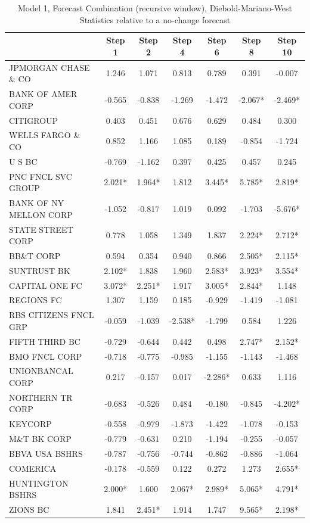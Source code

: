 \documentclass[11pt]{article}
\begin{document}
\begin{table} 
\caption{Model 1, Forecast Combination (recursive window), Diebold-Mariano-West Statistics relative to a no-change forecast}
                                                      
\center                                                             
\begin{tabular}{|l|c|c|c|c|c|c|}                                    
\hline                                                              
&Step 1 &Step 2 &Step 4 &Step 6 &Step 8 &Step 10\\                  
\hline                                                              
JPMORGAN CHASE \& CO  &1.246&1.071&0.813&0.789&0.391&-0.007\\       
BANK OF AMER CORP     &-0.565&-0.838&-1.269&-1.472&-2.067*&-2.469*\\
CITIGROUP             &0.403&0.451&0.676&0.629&0.484&0.300\\        
WELLS FARGO \& CO     &0.852&1.166&1.085&0.189&-0.854&-1.724\\      
U S BC                &-0.769&-1.162&0.397&0.425&0.457&0.245\\      
PNC FNCL SVC GROUP    &2.021*&1.964*&1.812&3.445*&5.785*&2.819*\\   
BANK OF NY MELLON CORP&-1.052&-0.817&1.019&0.092&-1.703&-5.676*\\   
STATE STREET CORP     &0.778&1.058&1.349&1.837&2.224*&2.712*\\      
BB\&T CORP            &0.594&0.354&0.940&0.866&2.505*&2.115*\\      
SUNTRUST BK           &2.102*&1.838&1.960&2.583*&3.923*&3.554*\\    
CAPITAL ONE FC        &3.072*&2.251*&1.917&3.005*&2.844*&1.148\\    
REGIONS FC            &1.307&1.159&0.185&-0.929&-1.419&-1.081\\     
RBS CITIZENS FNCL GRP &-0.059&-1.039&-2.538*&-1.799&0.584&1.226\\   
FIFTH THIRD BC        &-0.729&-0.644&0.442&0.498&2.747*&2.152*\\    
BMO FNCL CORP         &-0.718&-0.775&-0.985&-1.155&-1.143&-1.468\\  
UNIONBANCAL CORP      &0.217&-0.157&0.017&-2.286*&0.633&1.116\\     
NORTHERN TR CORP      &-0.683&-0.526&0.484&-0.180&-0.845&-4.202*\\  
KEYCORP               &-0.558&-0.979&-1.873&-1.422&-1.078&-0.153\\  
M\&T BK CORP          &-0.779&-0.631&0.210&-1.194&-0.255&-0.057\\   
BBVA USA BSHRS        &-0.787&-0.756&-0.744&-0.862&-0.886&-1.064\\  
COMERICA              &-0.178&-0.559&0.122&0.272&1.273&2.655*\\     
HUNTINGTON BSHRS      &2.000*&1.600&2.067*&2.989*&5.065*&4.791*\\   
ZIONS BC              &1.841&2.451*&1.914&1.747&9.565*&2.198*\\     
\hline                                                              
\end{tabular} 


\end{table}
\end{document}
